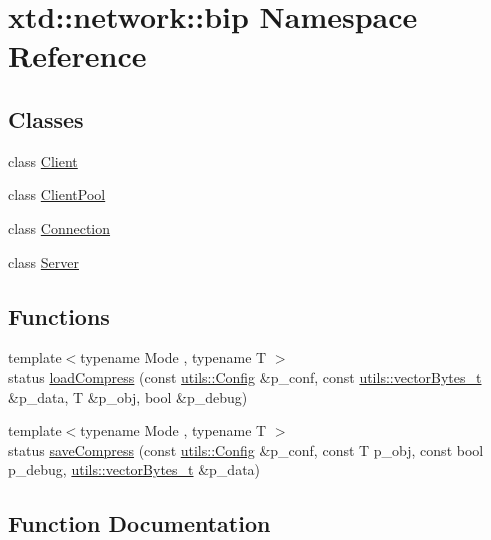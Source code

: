 \hypertarget{namespacextd_1_1network_1_1bip}{}\section{xtd\+:\+:network\+:\+:bip Namespace Reference}
\label{namespacextd_1_1network_1_1bip}
\subsection*{Classes}
\begin{DoxyCompactItemize}
\item 
class \hyperlink{classxtd_1_1network_1_1bip_1_1Client}{Client}
\item 
class \hyperlink{classxtd_1_1network_1_1bip_1_1ClientPool}{Client\+Pool}
\item 
class \hyperlink{classxtd_1_1network_1_1bip_1_1Connection}{Connection}
\item 
class \hyperlink{classxtd_1_1network_1_1bip_1_1Server}{Server}
\end{DoxyCompactItemize}
\subsection*{Functions}
\begin{DoxyCompactItemize}
\item 
{\footnotesize template$<$typename Mode , typename T $>$ }\\status \hyperlink{namespacextd_1_1network_1_1bip_a48193a997dc7b1e8f5515c86ec50405c}{load\+Compress} (const \hyperlink{classxtd_1_1network_1_1utils_1_1Config}{utils\+::\+Config} \&p\+\_\+conf, const \hyperlink{namespacextd_1_1network_1_1utils_a9fedf0d18549b8034e9ae347955e9a9a}{utils\+::vector\+Bytes\+\_\+t} \&p\+\_\+data, T \&p\+\_\+obj, bool \&p\+\_\+debug)
\item 
{\footnotesize template$<$typename Mode , typename T $>$ }\\status \hyperlink{namespacextd_1_1network_1_1bip_a86bf6b3f22dd9b8c49cc138e4cd44921}{save\+Compress} (const \hyperlink{classxtd_1_1network_1_1utils_1_1Config}{utils\+::\+Config} \&p\+\_\+conf, const T p\+\_\+obj, const bool p\+\_\+debug, \hyperlink{namespacextd_1_1network_1_1utils_a9fedf0d18549b8034e9ae347955e9a9a}{utils\+::vector\+Bytes\+\_\+t} \&p\+\_\+data)
\end{DoxyCompactItemize}


\subsection{Function Documentation}
